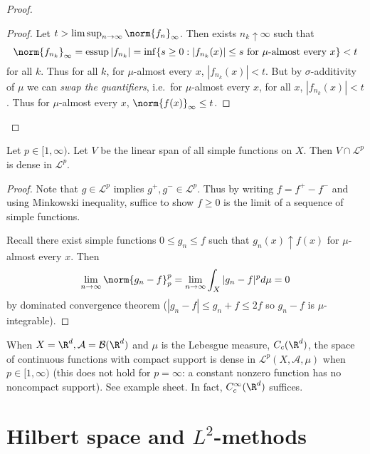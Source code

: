 \documentclass[a4paper]{article}
\DeclareMathOperator{\essup}{essup} %
\begin{document}
\begin{proof}
  \begin{proof}
    Let \(t > \limsup_{n \to \infty} \norm{f_n}_\infty\). Then exists \(n_k \uparrow \infty\) such that
    \[
      \norm{f_{n_k}}_\infty = \essup |f_{n_k}| = \inf \{s \geq 0: |f_{n_k}(x)| \leq s \text{ for \(\mu\)-almost every } x\} < t
    \]
    for all \(k\). Thus for all \(k\), for \(\mu\)-almost every \(x\), \(|f_{n_k}(x)| < t\). But by \(\sigma\)-additivity of \(\mu\) we can \emph{swap the quantifiers}, i.e.\ for \(\mu\)-almost every \(x\), for all \(x\), \(|f_{n_k}(x)| < t\). Thus for \(\mu\)-almost every \(x\), \(\norm{f(x)}_\infty \leq t\).
  \end{proof}
\end{proof}

\begin{proposition}
  Let \(p \in [1, \infty)\). Let \(V\) be the linear span of all simple functions on \(X\). Then \(V \cap \mathcal L^p\) is dense in \(\mathcal L^p\).
\end{proposition}

\begin{proof}
  Note that \(g \in \mathcal L^p\) implies \(g^+, g^- \in \mathcal L^p\). Thus by writing \(f = f^+ - f^-\) and using Minkowski inequality, suffice to show \(f \geq 0\) is the limit of a sequence of simple functions.

  Recall there exist simple functions \(0 \leq g_n \leq f\) such that \(g_n(x) \uparrow f(x)\) for \(\mu\)-almost every \(x\). Then
  \[
    \lim_{n \to \infty} \norm{g_n - f}_p^p = \lim_{n \to \infty} \int_X |g_n - f|^p d\mu = 0
  \]
  by dominated convergence theorem (\(|g_n - f| \leq g_n + f \leq 2f\) so \(g_n - f\) is \(\mu\)-integrable).
\end{proof}

\begin{remark}
  When \(X = \R^d, \mathcal A = \mathcal B(\R^d)\) and \(\mu\) is the Lebesgue measure, \(C_c(\R^d)\), the space of continuous functions with compact support is dense in \(\mathcal L^p(X, \mathcal A, \mu)\) when \(p \in [1, \infty)\) (this does not hold for \(p = \infty\): a constant nonzero function has no noncompact support). See example sheet. In fact, \(C_c^\infty(\R^d)\) suffices.
\end{remark}

\section{Hilbert space and \(L^2\)-methods}
\end{document}
